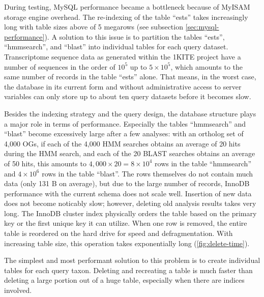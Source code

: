 \label{sec:mysql-performance-discussion}
During testing, MySQL performance became a bottleneck because of MyISAM storage
engine overhead. The re-indexing of the table ``ests'' takes increasingly long
with table sizes above of 5 megarows (see subsection
\autoref{sec:mysql-performance}). A solution to this issue is to partition the
tables ``ests'', ``hmmsearch'', and ``blast'' into individual tables for each
query dataset. Transcriptome sequence data as generated within the 1KITE project
have a number of sequences in the order of $10^5$ up to $5\times10^5$, which
amounts to the same number of records in the table ``ests'' alone. That means,
in the worst case, the database in its current form and without administrative
access to server variables can only store up to about ten query datasets before
it becomes slow.

Besides the indexing strategy and the query design, the database structure plays
a major role in terms of performance. Especially the tables ``hmmsearch'' and
``blast'' become excessively large after a few analyses: with an ortholog set of
4,000 OGs, if each of the 4,000 HMM searches obtains an average of 20 hits
during the HMM search, and each of the 20 BLAST searches obtains an average of
50 hits, this amounts to $4,000 \times 20 = 8 \times 10^4$ rows in the table
``hmmsearch'' and $4 \times 10^6$ rows in the table ``blast''.  The rows
themselves do not contain much data (only 131 B on average), but due to the
large number of records, InnoDB performance with the current schema does not
scale well. Insertion of new data does not become noticably slow; however,
deleting old analysis results takes very long. The InnoDB cluster index
physically orders the table based on the primary key or the first unique key it
can utilize. When one row is removed, the entire table is reordered on the hard
drive for speed and defragmentation. With increasing table size, this operation
takes exponentially long (\autoref{fig:delete-time}).

The simplest and most performant solution to this problem is to create
individual tables for each query taxon. Deleting and recreating a table is much
faster than deleting a large portion out of a huge table, especially when there
are indices involved. 


